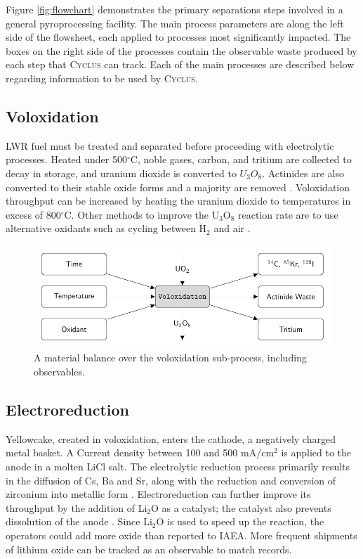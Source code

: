 \documentclass{anstrans}
\newcommand{\Cyclus}{\textsc{Cyclus}\xspace}%
\begin{document}
Figure \ref{fig:flowchart} demonstrates the primary separations steps involved in a general pyroprocessing facility. The main process 
parameters are along the left side of the flowsheet, each applied to processes most significantly impacted. The boxes on the 
right side of the processes contain the observable waste produced by each step that \Cyclus can track. Each of the main processes 
are described below regarding information to be used by \Cyclus.

\subsection{Voloxidation}

LWR fuel must be treated and separated before proceeding with electrolytic processes. Heated under 
500$^{\circ}$C, noble gases, carbon, and tritium are collected to decay in storage, and uranium dioxide is converted to $U_3O_8$. 
Actinides are also converted to their stable oxide forms and a majority are removed \cite{flowsheet_1998,jubin_spent_2009}. 
Voloxidation throughput can be increased by heating the uranium dioxide to temperatures in excess of 800$^{\circ}$C. 
Other methods to improve the U$_3$O$_8$ reaction rate are to use alternative oxidants such as cycling between H$_2$ and air \cite{jubin_spent_2009}.

\begin{figure}[ht]
	\centering
	\includegraphics[width=1\linewidth]{volox}
	\caption{A material balance over the voloxidation sub-process, including observables.}
	\label{fig:volox}
\end{figure}

\subsection{Electroreduction}

Yellowcake, created in voloxidation, enters the cathode, a negatively charged metal basket. A Current density between 100 and 
500 mA/cm$^2$ 
is applied to the anode in a molten LiCl salt. The electrolytic reduction process primarily results in the diffusion of 
Cs, Ba and Sr, along with the reduction and conversion of zirconium into metallic form \cite{choi_electrochemical_2015,flowsheet_1998}.
Electroreduction can further improve its throughput by the addition of Li$_2$O as a catalyst; the catalyst also prevents dissolution 
of the anode \cite{choi_electrochemical_2015}. Since Li$_2$O is used to speed up the reaction,
the operators could add more oxide than reported to IAEA. More frequent shipments 
of lithium oxide can be tracked as an observable to match records.
\end{document}
